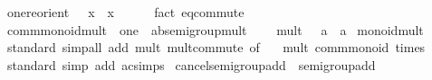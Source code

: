 \begin{isabellebody}
\endisatagproof
{\isafoldproof}%
%
\isadelimproof
\isanewline
%
\endisadelimproof
\isanewline
{}\isamarkupfalse%
\isanewline
\isanewline
{}\isamarkupfalse%
\ one{\isacharunderscore}{\kern0pt}reorient{\isacharcolon}{\kern0pt}\ {\isachardoublequoteopen}{}\ {\isacharequal}{\kern0pt}\ x\ {\isasymlongleftrightarrow}\ x\ {\isacharequal}{\kern0pt}\ {}{\isachardoublequoteclose}\isanewline
%
\isadelimproof
\ \ %
\endisadelimproof
%
\isatagproof
{}\isamarkupfalse%
\ {\isacharparenleft}{\kern0pt}fact\ eq{\isacharunderscore}{\kern0pt}commute{\isacharparenright}{\kern0pt}%
\endisatagproof
{\isafoldproof}%
%
\isadelimproof
\isanewline
%
\endisadelimproof
\isanewline
{}\isamarkupfalse%
\ comm{\isacharunderscore}{\kern0pt}monoid{\isacharunderscore}{\kern0pt}mult\ {\isacharequal}{\kern0pt}\ one\ {\isacharplus}{\kern0pt}\ ab{\isacharunderscore}{\kern0pt}semigroup{\isacharunderscore}{\kern0pt}mult\ {\isacharplus}{\kern0pt}\isanewline
\ \ \ mult{\isacharunderscore}{\kern0pt}{}{\isacharcolon}{\kern0pt}\ {\isachardoublequoteopen}{}\ {\isacharasterisk}{\kern0pt}\ a\ {\isacharequal}{\kern0pt}\ a{\isachardoublequoteclose}\isanewline
{}\isanewline
\isanewline
{}\isamarkupfalse%
\ monoid{\isacharunderscore}{\kern0pt}mult\isanewline
%
\isadelimproof
\ \ %
\endisadelimproof
%
\isatagproof
{}\isamarkupfalse%
\ standard\ {\isacharparenleft}{\kern0pt}simp{\isacharunderscore}{\kern0pt}all\ add{\isacharcolon}{\kern0pt}\ mult{\isacharunderscore}{\kern0pt}{}\ mult{\isachardot}{\kern0pt}commute\ {\isacharbrackleft}{\kern0pt}of\ {\isacharunderscore}{\kern0pt}\ {}{\isacharbrackright}{\kern0pt}{\isacharparenright}{\kern0pt}%
\endisatagproof
{\isafoldproof}%
%
\isadelimproof
\isanewline
%
\endisadelimproof
\isanewline
{}\isamarkupfalse%
\ mult{\isacharcolon}{\kern0pt}\ comm{\isacharunderscore}{\kern0pt}monoid\ times\ {}\isanewline
%
\isadelimproof
\ \ %
\endisadelimproof
%
\isatagproof
{}\isamarkupfalse%
\ standard\ {\isacharparenleft}{\kern0pt}simp\ add{\isacharcolon}{\kern0pt}\ ac{\isacharunderscore}{\kern0pt}simps{\isacharparenright}{\kern0pt}%
\endisatagproof
{\isafoldproof}%
%
\isadelimproof
\isanewline
%
\endisadelimproof
\isanewline
{}\isamarkupfalse%
\isanewline
\isanewline
{}\isamarkupfalse%
\ cancel{\isacharunderscore}{\kern0pt}semigroup{\isacharunderscore}{\kern0pt}add\ {\isacharequal}{\kern0pt}\ semigroup{\isacharunderscore}{\kern0pt}add\ {\isacharplus}{\kern0pt}\isanewline

\end{isabellebody}
